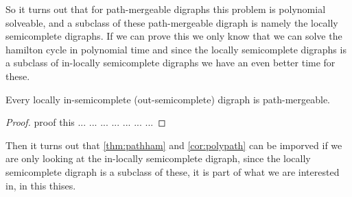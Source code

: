So it turns out that for path-mergeable digraphs this problem is polynomial solveable, and a subclass of these path-mergeable digraph is namely the locally semicomplete digraphs. If we can prove this we only know that we can solve the hamilton cycle in polynomial time and since the locally semicomplete digraphs is a subclass of in-locally semicomplete digraphs we have an even better time for these.
\begin{proposition}
    Every locally in-semicomplete (out-semicomplete) digraph is path-mergeable.
\end{proposition}
\begin{proof}
    proof this ... ... ... ... ... ... ... 
\end{proof}

Then it turns out that \autoref{thm:pathham} and \autoref{cor:polypath} can be imporved if we are only looking at the in-locally semicomplete digraph, since the locally semicomplete digraph is a subclass of these, it is part of what we are interested in, in this thises.


